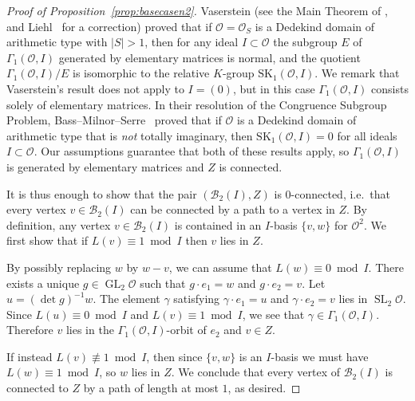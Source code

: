 \documentclass[11 pt]{article}
\theoremstyle{plain}
\theoremstyle{definition}
\numberwithin{equation}{section}
\DeclareMathOperator{\GL}{GL}
\DeclareMathOperator{\SL}{SL}
\renewcommand{\O}{\mathcal{O}}
\newcommand\PartialBases{\ensuremath{\mathcal{B}}}
\newcommand{\PB}{\PartialBases}
\newcommand\abs[1]{\left\lvert#1\right\rvert}
\begin{document}
\begin{proof}[Proof of Proposition~\ref{prop:basecasen2}]
Vaserstein (see the Main Theorem of \cite{VasersteinGen}, and  Liehl~\cite{Liehl} for a correction) 
proved that if $\O=\O_S$ is a Dedekind domain of arithmetic type with $\abs{S}>1$, then for any ideal $I\subset \O$ the subgroup $E$ of $\Gamma_1(\O,I)$
generated by elementary matrices is normal, and the quotient
$\Gamma_1(\O,I)/E$ is isomorphic to the relative $K$-group $\text{SK}_1(\O,I)$.  We remark that
Vaserstein's result does not apply to $I=(0)$, but in this case $\Gamma_1(\O,I)$ consists solely of elementary matrices.
In their resolution of the Congruence Subgroup Problem, Bass--Milnor--Serre~\cite[Theorem~3.6]{BassMilnorSerre} proved that if $\O$ is a Dedekind domain of arithmetic type that is \emph{not} totally imaginary, then $\text{SK}_1(\O,I) = 0$ for all ideals $I\subset \O$. Our assumptions guarantee that both of these results apply, so $\Gamma_1(\O,I)$ is generated by elementary matrices and $Z$ is connected.

It is thus enough to show that the pair $(\PB_2(I),Z)$ is $0$-connected, i.e.\ that every vertex
$v\in \PB_2(I)$ can be connected by a path to a vertex in $Z$. By definition, any vertex $v\in\PB_2(I)$ 
is contained in an $I$-basis $\{v,w\}$ for $\O^2$.
We first show that if $L(v)\equiv 1 \bmod{I}$ then $v$ lies in $Z$.  

By possibly replacing $w$ by $w-v$, we can assume that $L(w)\equiv 0\bmod{I}$. There exists a unique $g\in \GL_2 \O$ such that $g\cdot e_1=w$ and $g\cdot e_2=v$. Let $u = (\det g)^{-1} w$.  The element $\gamma$ satisfying $\gamma\cdot e_1=u$ and $\gamma\cdot e_2=v$ lies in $\SL_2 \O$. Since $L(u)\equiv 0\bmod{I}$ and $L(v)\equiv 1\bmod{I}$, we see that $\gamma\in \Gamma_1(\O,I)$. Therefore $v$ lies in the $\Gamma_1(\O,I)$-orbit of $e_2$ and $v\in Z$.

If instead $L(v)\not\equiv 1\bmod{I}$, then since $\{v,w\}$ is an $I$-basis we must have $L(w)\equiv 1\bmod{I}$, so $w$ lies in $Z$. We conclude that every vertex of $\PB_2(I)$ is connected to $Z$ by a path of length at most $1$, as desired.
\end{proof}
\end{document}
